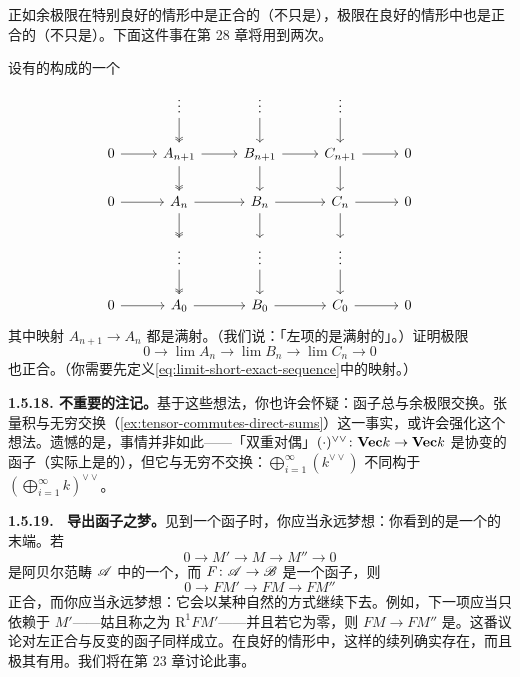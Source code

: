 正如余极限在特别良好的情形中是正合的（不只是\trRightExact），极限在良好的情形中也是正合的（不只是\trLeftExact）。下面这件事在第 28 章将用到两次。

\begin{exercise}\label{ex:exactness-of-inverse-limits}
设有\trModule{}的\trExactSequence{}构成的一个\trInverseSystem
\[
\begin{tikzcd}[row sep=1.8em, column sep=2.6em]
 & \vdots \ar[d,two heads] & \vdots \ar[d] & \vdots \ar[d] & \\
0 \ar[r] & A_{n+1} \ar[d,two heads] \ar[r] & B_{n+1} \ar[d] \ar[r] & C_{n+1} \ar[d] \ar[r] & 0 \\
0 \ar[r] & A_{n} \ar[d,two heads] \ar[r] & B_{n} \ar[d] \ar[r] & C_{n} \ar[d] \ar[r] & 0 \\
 & \vdots \ar[d,two heads] & \vdots \ar[d] & \vdots \ar[d] & \\
0 \ar[r] & A_{0} \ar[r] & B_{0} \ar[r] & C_{0} \ar[r] & 0
\end{tikzcd}
\]
其中映射 $A_{n+1}\to A_n$ 都是满射。（我们说：「左项的\trTransitionMap{}是满射的」。）证明极限
\begin{equation*}\tag{1.5.17.1}\label{eq:limit-short-exact-sequence}
0\longrightarrow\lim A_{n}\longrightarrow\lim B_{n}\longrightarrow\lim C_{n}\longrightarrow 0
\end{equation*}
也正合。（你需要先定义\eqref{eq:limit-short-exact-sequence}中的映射。）
\end{exercise}

\textbf{1.5.18. 不重要的注记。}\quad 基于这些想法，你也许会怀疑：\trRightExact{}函子总与余极限交换。张量积与无穷\trDirectSum{}交换（\cref{ex:tensor-commutes-direct-sums}）这一事实，或许会强化这个想法。遗憾的是，事情并非如此——「双重对偶」$(\cdot)^{\vee\vee}\colon\mathbf{Vec}{k}\to\mathbf{Vec}{k}$ 是协变的\trRightExact{}函子（实际上是\trExact{}的），但它与无穷\trDirectSum{}不交换：$\bigoplus_{i=1}^{\infty}(k^{\vee\vee})$ 不同构于 $(\bigoplus_{i=1}^{\infty}k)^{\vee\vee}$。

\textbf{1.5.19. \hard\ 导出函子之梦。}\quad 见到一个\trLeftExact{}函子时，你应当永远梦想：你看到的是一个\trLongExactSequence{}的末端。若
\[
0\longrightarrow M'\longrightarrow M\longrightarrow M''\longrightarrow 0
\]
是阿贝尔范畴 $\mathscr{A}$ 中的一个\trExactSequence，而 $F\colon\mathscr{A}\to\mathscr{B}$ 是一个\trLeftExact{}函子，则
\[
0\longrightarrow FM'\longrightarrow FM\longrightarrow FM''
\]
正合，而你应当永远梦想：它会以某种自然的方式继续下去。例如，下一项应当只依赖于 $M'$——姑且称之为 $\mathrm{R}^{1}FM'$——并且若它为零，则 $FM\to FM''$ 是\trEpimorphism。这番议论对左正合与反变的函子同样成立。在良好的情形中，这样的续列确实存在，而且极其有用。我们将在第 23 章讨论此事。

